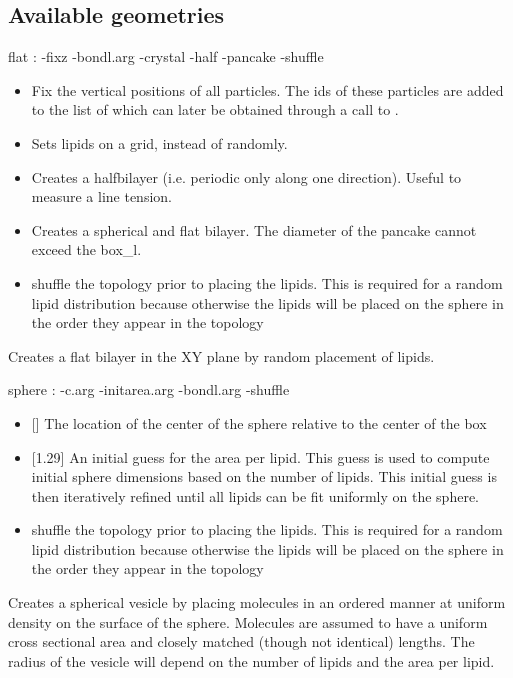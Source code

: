 \subsection{Available geometries}

\begin{code}
  flat  :  -fixz -bondl.arg -crystal -half -pancake -shuffle
\end{code}
\begin{itemize}
\item {} Fix the vertical positions of all particles. The ids of these particles are added to the list of  which can later be obtained through a call to .
\item {} Sets lipids on a grid, instead of randomly.
\item {} Creates a halfbilayer (i.e. periodic only along one direction). Useful to measure a line tension.
\item {} Creates a spherical and flat bilayer. The diameter of the pancake cannot exceed the box\_l.
\item {} shuffle the topology prior to placing the lipids. This is required for a random lipid distribution because otherwise the lipids will be placed on the sphere in the order they appear in the topology
\end{itemize}
Creates a flat bilayer in the XY plane by random placement of lipids.


\begin{code}
  sphere : -c.arg -initarea.arg -bondl.arg -shuffle
\end{code}
\begin{itemize}
\item {} [] The location of the center of the sphere relative to the center of the box
\item {} [1.29] An initial guess for the area per lipid. This guess is used to compute initial sphere dimensions based on the number of lipids. This initial guess is then iteratively refined until all lipids can be fit uniformly on the sphere.
\item {} shuffle the topology prior to placing the lipids. This is required for a random lipid distribution because otherwise the lipids will be placed on the sphere in the order they appear in the topology
\end{itemize}
Creates a spherical vesicle by placing molecules in an ordered manner at uniform density on the surface of the sphere. Molecules are assumed to have a uniform cross sectional area and closely matched (though not identical) lengths. The radius of the vesicle will depend on the number of lipids and the area per lipid.



